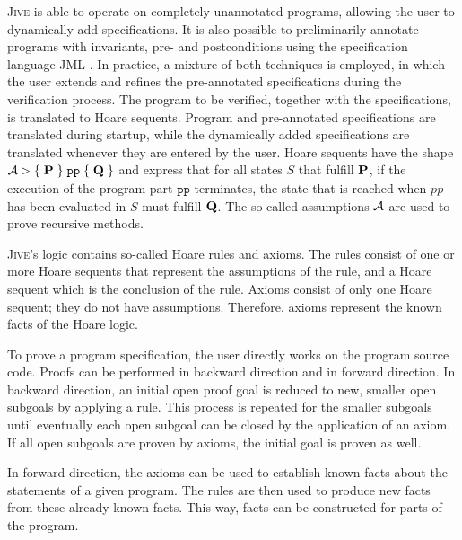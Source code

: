 \documentclass[11pt,a4paper,twoside]{article}
\renewcommand{\jive}{\textsc{Jive}\xspace}
\begin{document}
\jive is able to operate on completely unannotated programs, allowing the user to dynamically add specifications. It is also possible to preliminarily annotate programs with invariants, pre- and postconditions using the specification language JML 
\cite{Leavens.BakerEA99jml}. In practice, a mixture of both techniques is employed, in which the user extends and refines the pre-annotated specifications during the verification process.
The program to be verified, together with the specifications, is translated to Hoare sequents. Program and pre-annotated specifications are translated during startup, while the dynamically added specifications are translated whenever they are entered by the user.
Hoare sequents have the shape
$\mbox{${\cal A}$} \, \bigl| \hspace{-2.6pt} \vartriangleright \mbox{$\{\;$} \mbox{{\bf P}} \mbox{$\;\}$} \; \mathtt{pp} \; \mbox{$\{\;$} \mbox{{\bf Q}} \mbox{$\;\}$}$ and express that for all states $S$ that fulfill $\mbox{{\bf P}}$, if the execution of the program part $\mathtt{pp}$ terminates,
the state that is reached when $pp$ has been evaluated in $S$ must
fulfill $\mbox{{\bf Q}}$. The so-called assumptions $\mbox{${\cal A}$}$ are used to prove recursive methods.

\jive's logic contains so-called Hoare rules and axioms. The rules consist of one or more Hoare sequents that represent the assumptions of the rule, and a Hoare sequent which is the conclusion of the rule. Axioms consist of only one Hoare sequent; they do not have assumptions. Therefore, axioms represent the known facts of the Hoare logic.

To prove a program specification, the user directly works on the program source code.
Proofs can be performed in backward direction and in forward direction. In backward direction, an initial open proof goal is reduced to new, smaller open subgoals by applying a rule. This process is repeated for the smaller subgoals until eventually each open subgoal can be closed by the application of an axiom. If all open subgoals are proven by axioms, the initial goal is proven as well.

In forward direction, the axioms can be used to establish known facts about the statements of a given program.
The rules are then used to produce new facts from these already known facts. This way, facts can be constructed for parts of the program.
\end{document}
